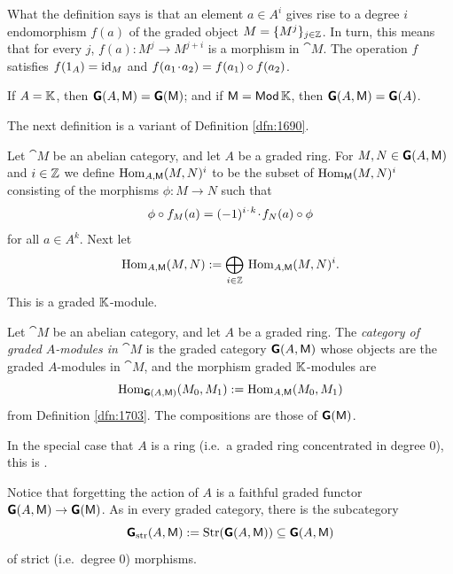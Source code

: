 What the definition says is that an element 
$a \in A^i$ gives rise to a degree $i$ endomorphism 
$f(a)$ of the graded object $M  = \{ M^j \}_{j \in \mathbb{Z}}$. In turn, this means 
that for every $j$, 
$f(a) : M^j \to M^{j + i}$ is a morphism in $\cat{M}$.  
The operation $f$ satisfies $f(1_A) = \operatorname{id}_M$ and 
$f(a_1 \mspace{1.5mu}{\cdot}\mspace{1.5mu} a_2) = f(a_1) \circ f(a_2)$. 

\begin{exa}  \label{exa:1701}
If $A = \mathbb{K}$, then $\boldsymbol{\mathsf{G}}(A, \operatorname{\mathsf{M}}) = \boldsymbol{\mathsf{G}}(\operatorname{\mathsf{M}})$; 
and if $\operatorname{\mathsf{M}} = \operatorname{\mathsf{Mod}} \mathbb{K}$, then 
$\boldsymbol{\mathsf{G}}(A, \operatorname{\mathsf{M}}) = \boldsymbol{\mathsf{G}}(A)$.
\end{exa}

The next definition is a variant of Definition \ref{dfn:1690}.

\begin{dfn} \label{dfn:1703}
Let $\cat{M}$ be an abelian category, and let $A$ be a 
graded ring. For $M, N \in \boldsymbol{\mathsf{G}}(A, \operatorname{\mathsf{M}})$ and $i \in \mathbb{Z}$ 
we define 
$\operatorname{Hom}_{A, \operatorname{\mathsf{M}}}(M, N)^i$ to be the subset of 
$\operatorname{Hom}_{\operatorname{\mathsf{M}}}(M, N)^i$ consisting of the  morphisms 
$\phi : M \to N$ such that
\[ \phi \circ f_M(a) = (-1)^{i \mspace{1.5mu}{\cdot}\mspace{1.5mu} k} \mspace{1.5mu}{\cdot}\mspace{1.5mu} f_N(a) \circ \phi \]
for all $a \in A^k$. Next let 
\[ \operatorname{Hom}_{A, \operatorname{\mathsf{M}}}(M, N) := 
\bigoplus_{i \in \mathbb{Z}} \, \operatorname{Hom}_{A, \operatorname{\mathsf{M}}}(M, N)^i . \]
This is a graded $\mathbb{K}$-module.
\end{dfn}

\begin{dfn} \label{dfn:1704}
Let $\cat{M}$ be an abelian category, and let $A$ be a graded   
ring. The {\em category of graded $A$-modules in $\cat{M}$}
is the graded category $\boldsymbol{\mathsf{G}}(A, \operatorname{\mathsf{M}})$
whose objects are the graded $A$-modules in 
$\cat{M}$, and the morphism graded $\mathbb{K}$-modules are 
\[ \operatorname{Hom}_{\boldsymbol{\mathsf{G}}(A, \operatorname{\mathsf{M}})}(M_0, M_1) :=
\operatorname{Hom}_{A, \operatorname{\mathsf{M}}}(M_0, M_1)  \]
from Definition \ref{dfn:1703}. 
The compositions are those of $\boldsymbol{\mathsf{G}}(\operatorname{\mathsf{M}})$. 
\end{dfn}

In the special case that $A$ is a ring (i.e.\ a graded ring 
concentrated in degree $0$), this is \cite[Definition 8.5.1]{KaSc2}. 

Notice that forgetting the action of $A$ is a faithful graded 
functor $\boldsymbol{\mathsf{G}}(A, \operatorname{\mathsf{M}}) \to \boldsymbol{\mathsf{G}}(\operatorname{\mathsf{M}})$.
As in every graded category, there is the subcategory
\begin{equation} \label{eqn:2360}
\boldsymbol{\mathsf{G}}_{\mathrm{str}}(A, \operatorname{\mathsf{M}}) := \operatorname{Str}(\boldsymbol{\mathsf{G}}(A, \operatorname{\mathsf{M}}))
\subseteq \boldsymbol{\mathsf{G}}(A, \operatorname{\mathsf{M}})
\end{equation}
of strict (i.e.\ degree $0$) morphisms. 

